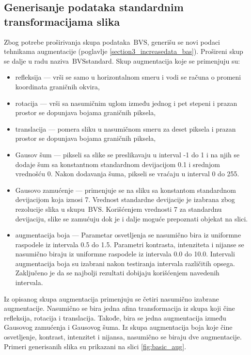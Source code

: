 \documentclass[12pt,oneside]{memoir}
\newcommand{\bvs}{\ensuremath{\,\textrm{BVS}}}
\begin{document}
\clearpage
\subsection{Generisanje podataka standardnim transformacijama slika}

Zbog potrebe proširivanja skupa podataka \bvs, generišu se novi podaci tehnikama augmentacije (poglavlje \ref{section3_increasedata_bas}). Prošireni skup se dalje u radu naziva \bvs{standard}.
Skup augmentacija koje se primenjuju su: 
\begin{itemize}
    \item refleksija --- vrši se samo u horizontalnom smeru i vodi se računa o promeni koordinata graničnih okvira, 
    \item rotacija --- vrši sa nasumičnim uglom između jednog i pet stepeni i prazan prostor se dopunjava bojama graničnih piksela,
    \item translacija ---  pomera sliku u nasumičnom smeru za deset piksela i prazan prostor se dopunjava bojama graničnih piksela,
    \item Gausov šum --- pikseli sa slike se preslikavaju u interval -1 do 1 i na njih se dodaje šum sa konstantnom standardnom devijacijom 0.1 i srednjom vrednošću 0. Nakon dodavanja šuma, pikseli se vraćaju u interval 0 do 255.
    \item Gausovo zamućenje --- primenjuje se na sliku sa konstantom standardnom devijacijom koja iznosi 7. Vrednost standardne devijacije je izabrana zbog rezolucije slika u skupu \bvs. Korišćenjem vrednosti 7 za standardnu devijaciju, slike se zamućuju dok je i dalje moguće prepoznati objekat na slici.
    \item augmentacija boja --- Parametar osvetljenja se nasumično bira iz uniformne raspodele iz intervala 0.5 do 1.5. Parametri kontrasta, intenziteta i nijanse se nasumično biraju iz uniformne raspodele iz intervala 0.0 do 10.0. Intervali augmentacija boja su izabrani nakon testiranja intervala različitih opsega. Zaključeno je da se najbolji rezultati dobijaju korišćenjem navedenih intervala.
\end{itemize}

\noindent Iz opisanog skupa augmentacija primenjuju se četiri nasumično izabrane augmentacije. Nasumično se bira jedna afina transformacija iz skupa koji čine refleksija, rotacija i translacija. Takođe, bira se jedna augmentacija između Gausovog zamućenja i Gausovog šuma. Iz skupa augmentacija boja koje čine osvetljenje, kontrast, intenzitet i nijansa, nasumično se biraju dve augmentacije. Primeri generisanih slika su prikazani na slici \ref{fig:basic_aug}.
\end{document}
